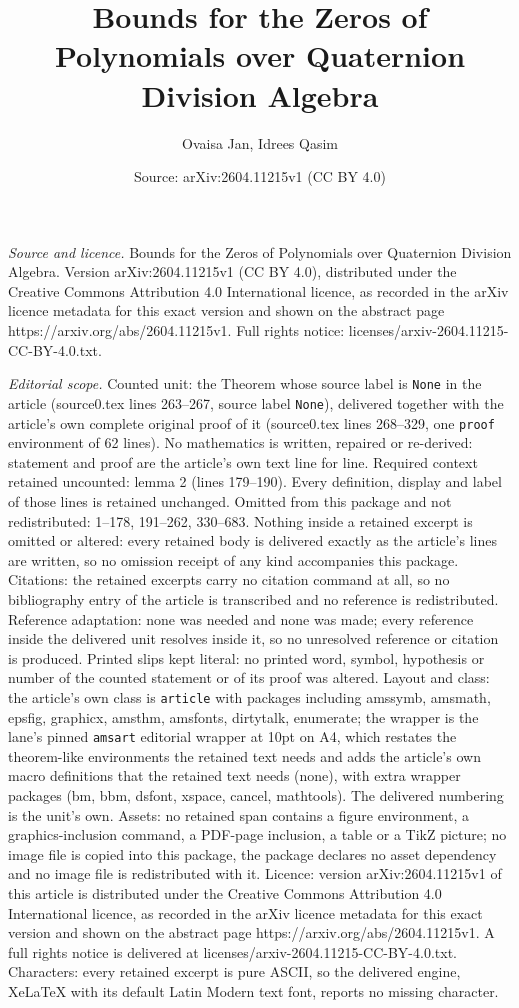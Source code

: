\documentclass[10pt,a4paper]{amsart}
\title[Bounds for the Zeros of Polynomials over Quaternion Division]{Bounds for the Zeros of Polynomials over Quaternion Division Algebra}
\author{Ovaisa Jan, Idrees Qasim}
\date{Source: arXiv:2604.11215v1 (CC BY 4.0)}
\begin{document}
\maketitle

\noindent\emph{Source and licence.} Bounds for the Zeros of Polynomials over Quaternion Division Algebra. Version arXiv:2604.11215v1 (CC BY 4.0), distributed under the Creative Commons Attribution 4.0 International licence, as recorded in the arXiv licence metadata for this exact version and shown on the abstract page https://arxiv.org/abs/2604.11215v1. Full rights notice: licenses/arxiv-2604.11215-CC-BY-4.0.txt.\par\smallskip

\noindent\textit{Editorial scope.} Counted unit: the Theorem whose source label is \texttt{None} in the article (source0.tex lines 263--267, source label \texttt{None}), delivered together with the article's own complete original proof of it (source0.tex lines 268--329, one \texttt{proof} environment of 62 lines). No mathematics is written, repaired or re-derived: statement and proof are the article's own text line for line. Required context retained uncounted: lemma 2 (lines 179--190). Every definition, display and label of those lines is retained unchanged. Omitted from this package and not redistributed: 1--178, 191--262, 330--683. Nothing inside a retained excerpt is omitted or altered: every retained body is delivered exactly as the article's lines are written, so no omission receipt of any kind accompanies this package. Citations: the retained excerpts carry no citation command at all, so no bibliography entry of the article is transcribed and no reference is redistributed. Reference adaptation: none was needed and none was made; every reference inside the delivered unit resolves inside it, so no unresolved reference or citation is produced. Printed slips kept literal: no printed word, symbol, hypothesis or number of the counted statement or of its proof was altered. Layout and class: the article's own class is \texttt{article} with packages including amssymb, amsmath, epsfig, graphicx, amsthm, amsfonts, dirtytalk, enumerate; the wrapper is the lane's pinned \texttt{amsart} editorial wrapper at 10pt on A4, which restates the theorem-like environments the retained text needs and adds the article's own macro definitions that the retained text needs (none), with extra wrapper packages (bm, bbm, dsfont, xspace, cancel, mathtools). The delivered numbering is the unit's own. Assets: no retained span contains a figure environment, a graphics-inclusion command, a PDF-page inclusion, a table or a TikZ picture; no image file is copied into this package, the package declares no asset dependency and no image file is redistributed with it. Licence: version arXiv:2604.11215v1 of this article is distributed under the Creative Commons Attribution 4.0 International licence, as recorded in the arXiv licence metadata for this exact version and shown on the abstract page https://arxiv.org/abs/2604.11215v1. A full rights notice is delivered at licenses/arxiv-2604.11215-CC-BY-4.0.txt. Characters: every retained excerpt is pure ASCII, so the delivered engine, XeLaTeX with its default Latin Modern text font, reports no missing character.
\end{document}
